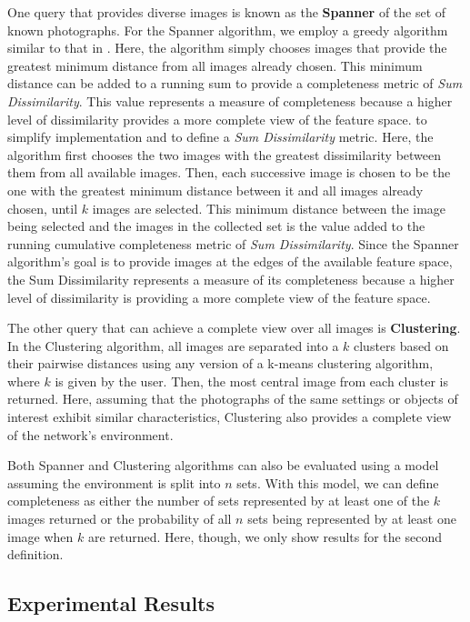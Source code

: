 One query that provides diverse images is known as the {\bf Spanner} of the set of known photographs.  For the Spanner algorithm, we employ a greedy algorithm similar to that in \cite{mediascope}.  Here, the algorithm simply chooses images that provide the greatest minimum distance from all images already chosen.  This minimum distance can be added to a running sum to provide a completeness metric of \emph{Sum Dissimilarity}.  This value represents a measure of completeness because a higher level of dissimilarity provides a more complete view of the feature space.
 to simplify implementation and to define a \emph{Sum Dissimilarity} metric.  
Here, the algorithm first chooses the two images with the greatest dissimilarity between them from all available images.  Then, each successive image is chosen to be the one with the greatest minimum distance between it and all images already chosen, until $k$ images are selected.  This minimum distance between the image being selected and the images in the collected set is the value added to the running cumulative completeness metric of \emph{Sum Dissimilarity}.  Since the Spanner algorithm's goal is to provide images at the edges of the available feature space, the Sum Dissimilarity represents a measure of its completeness because a higher level of dissimilarity is providing a more complete view of the feature space.

The other query that can achieve a complete view over all images is {\bf Clustering}.  In the Clustering algorithm, all images are separated into a $k$ clusters based on their pairwise distances using any version of a k-means clustering algorithm, where $k$ is given by the user.  Then, the most central image from each cluster is returned.  
Here, assuming that the photographs of the same settings or objects of interest exhibit similar characteristics, 
Clustering also provides a complete view of the network's environment.

Both Spanner and Clustering algorithms can also be evaluated using a model assuming the environment is split into $n$ sets.  With this model, we can define completeness as either the number of sets represented by at least one of the $k$ images returned or the probability of all $n$ sets being represented by at least one image when $k$ are returned.  Here, though, we only show results for the second definition.

\subsection{Experimental Results}

